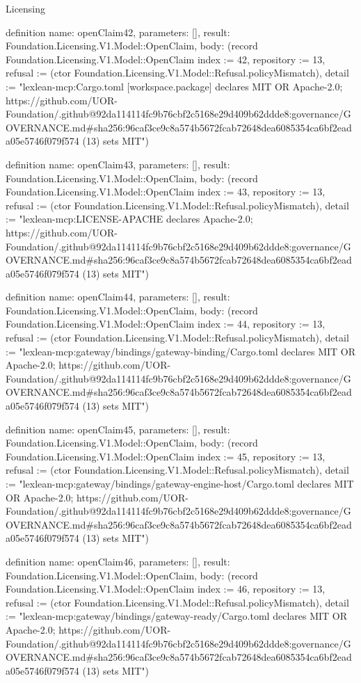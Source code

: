 \begin{lexlean}{Licensing}
\begin{semanticmodule}
definition{
  name: openClaim42,
  parameters: [],
  result: Foundation.Licensing.V1.Model::OpenClaim,
  body: (record Foundation.Licensing.V1.Model::OpenClaim {index := 42, repository := 13, refusal := (ctor Foundation.Licensing.V1.Model::Refusal.policyMismatch), detail := "lexlean-mcp:Cargo.toml [workspace.package] declares MIT OR Apache-2.0; https://github.com/UOR-Foundation/.github@92da114114fc9b76cbf2c5168e29d409b62ddde8:governance/GOVERNANCE.md#sha256:96caf3ce9c8a574b5672fcab72648dea6085354ca6bf2eada05e5746f079f574 (13) sets MIT"})
}

definition{
  name: openClaim43,
  parameters: [],
  result: Foundation.Licensing.V1.Model::OpenClaim,
  body: (record Foundation.Licensing.V1.Model::OpenClaim {index := 43, repository := 13, refusal := (ctor Foundation.Licensing.V1.Model::Refusal.policyMismatch), detail := "lexlean-mcp:LICENSE-APACHE declares Apache-2.0; https://github.com/UOR-Foundation/.github@92da114114fc9b76cbf2c5168e29d409b62ddde8:governance/GOVERNANCE.md#sha256:96caf3ce9c8a574b5672fcab72648dea6085354ca6bf2eada05e5746f079f574 (13) sets MIT"})
}

definition{
  name: openClaim44,
  parameters: [],
  result: Foundation.Licensing.V1.Model::OpenClaim,
  body: (record Foundation.Licensing.V1.Model::OpenClaim {index := 44, repository := 13, refusal := (ctor Foundation.Licensing.V1.Model::Refusal.policyMismatch), detail := "lexlean-mcp:gateway/bindings/gateway-binding/Cargo.toml declares MIT OR Apache-2.0; https://github.com/UOR-Foundation/.github@92da114114fc9b76cbf2c5168e29d409b62ddde8:governance/GOVERNANCE.md#sha256:96caf3ce9c8a574b5672fcab72648dea6085354ca6bf2eada05e5746f079f574 (13) sets MIT"})
}

definition{
  name: openClaim45,
  parameters: [],
  result: Foundation.Licensing.V1.Model::OpenClaim,
  body: (record Foundation.Licensing.V1.Model::OpenClaim {index := 45, repository := 13, refusal := (ctor Foundation.Licensing.V1.Model::Refusal.policyMismatch), detail := "lexlean-mcp:gateway/bindings/gateway-engine-host/Cargo.toml declares MIT OR Apache-2.0; https://github.com/UOR-Foundation/.github@92da114114fc9b76cbf2c5168e29d409b62ddde8:governance/GOVERNANCE.md#sha256:96caf3ce9c8a574b5672fcab72648dea6085354ca6bf2eada05e5746f079f574 (13) sets MIT"})
}

definition{
  name: openClaim46,
  parameters: [],
  result: Foundation.Licensing.V1.Model::OpenClaim,
  body: (record Foundation.Licensing.V1.Model::OpenClaim {index := 46, repository := 13, refusal := (ctor Foundation.Licensing.V1.Model::Refusal.policyMismatch), detail := "lexlean-mcp:gateway/bindings/gateway-ready/Cargo.toml declares MIT OR Apache-2.0; https://github.com/UOR-Foundation/.github@92da114114fc9b76cbf2c5168e29d409b62ddde8:governance/GOVERNANCE.md#sha256:96caf3ce9c8a574b5672fcab72648dea6085354ca6bf2eada05e5746f079f574 (13) sets MIT"})
}


\end{semanticmodule}
\end{lexlean}
